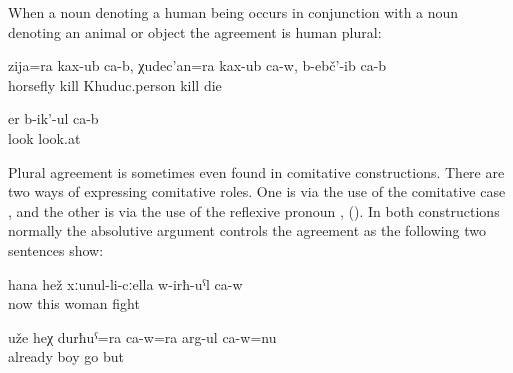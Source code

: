 When a noun denoting a human being occurs in conjunction with a noun denoting an animal or object the agreement is human plural:
%
\begin{exe}
	\ex	\label{ex:‎(The Sanzhi man shot) and killed the horsefly and he killed the Xuduc man, and (they both) died}
	\gll	zija=ra	kax-ub	ca-b,	χudec'an=ra	kax-ub	ca-w,	b-ebč'-ib	ca-b\\
		horsefly	kill		Khuduc.person	kill 	die	\\
	\glt	{}

	\ex	\label{ex:(The boy and the dog) are looking}
	\gll	er	b-ik'-ul	ca-b\\
		look	look.at	\\
	\glt	{}
\end{exe}

Plural agreement is sometimes even found in comitative constructions. There are two ways of expressing comitative roles. One is via the use of the comitative case ,  and the other is via the use of the reflexive pronoun ,  (). In both constructions normally the absolutive argument controls the agreement as the following two sentences show:
%
\begin{exe}
	\ex	\label{ex:Now he is fighting with this wife}
	\gll	hana	hež	xːunul-li-cːella	w-irħ-uˁl	ca-w\\
		now	this	woman	fight	\\
	\glt	{}

	\ex	\label{ex:He is already walking with this son}
	\gll	uže	heχ	durħuˁ=ra	ca-w=ra	arg-ul	ca-w=nu\\
		already		boy		go	but\\
	\glt	{}
\end{exe}

